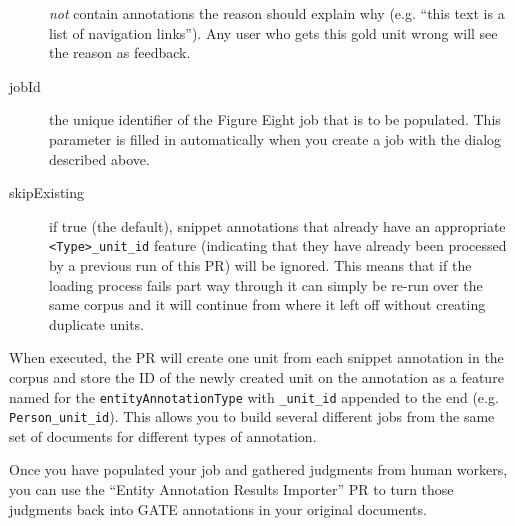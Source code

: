 \begin{description}
  \emph{not} contain annotations the reason should explain why (e.g. ``this
  text is a list of navigation links'').  Any user who gets this gold unit
  wrong will see the reason as feedback.
\item[jobId] the unique identifier of the Figure Eight job that is to be
  populated.  This parameter is filled in automatically when you create a job
  with the dialog described above.
\item[skipExisting] if true (the default), snippet annotations that already have
  an appropriate \verb!<Type>_unit_id! feature (indicating that they have
  already been processed by a previous run of this PR) will be ignored.  This
  means that if the loading process fails part way through it can simply be
  re-run over the same corpus and it will continue from where it left off
  without creating duplicate units.
\end{description}

When executed, the PR will create one unit from each snippet annotation in the
corpus and store the ID of the newly created unit on the annotation as a
feature named for the \verb!entityAnnotationType! with \verb!_unit_id! appended
to the end (e.g. \verb!Person_unit_id!).  This allows you to build several
different jobs from the same set of documents for different types of
annotation.


Once you have populated your job and gathered judgments from human workers, you
can use the ``Entity Annotation Results Importer'' PR to turn those
judgments back into GATE annotations in your original documents.

